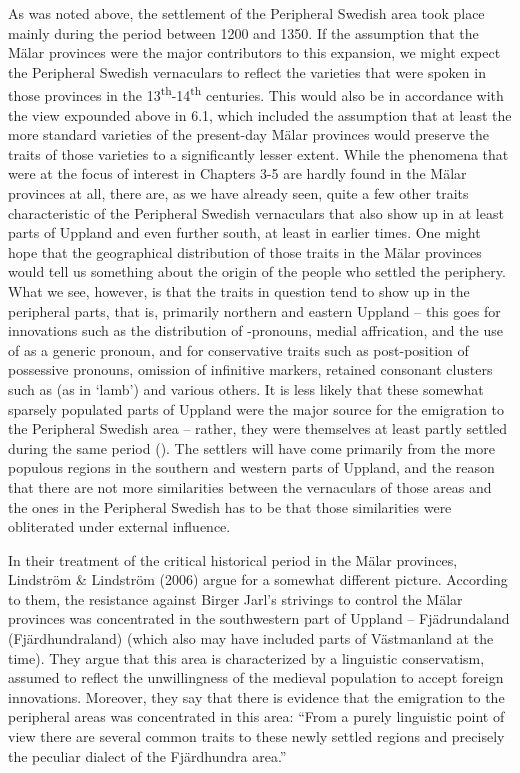 As was noted above, the settlement of the Peripheral Swedish area took place mainly during the period between 1200 and 1350. If the assumption that the Mälar provinces were the major contributors to this expansion, we might expect the Peripheral Swedish vernaculars to reflect the varieties that were spoken in those provinces in the 13\textsuperscript{th}{}-14\textsuperscript{th} centuries. This would also be in accordance with the view expounded above in 6.1, which included the assumption that at least the more standard varieties of the present-day Mälar provinces would preserve the traits of those varieties to a significantly lesser extent. While the phenomena that were at the focus of interest in Chapters 3{}-5 are hardly found in the Mälar provinces at all, there are, as we have already seen, quite a few other traits characteristic of the Peripheral Swedish vernaculars that also show up in at least parts of Uppland and even further south, at least in earlier times. One might hope that the geographical distribution of those traits in the Mälar provinces would tell us something about the origin of the people who settled the periphery. What we see, however, is that the traits in question tend to show up in the peripheral parts, that is, primarily northern and eastern Uppland – this goes for innovations such as the distribution of -pronouns, medial affrication, and the use of  as a generic pronoun, and for conservative traits such as post-position of possessive pronouns, omission of infinitive markers, retained consonant clusters such as (as in ‘lamb’)\textit{ }and various others. It is less likely that these somewhat sparsely populated parts of Uppland were the major source for the emigration to the Peripheral Swedish area – rather, they were themselves at least partly settled during the same period (\citet{Broberg1990}). The settlers will have come primarily from the more populous regions in the southern and western parts of Uppland, and the reason that there are not more similarities between the vernaculars of those areas and the ones in the Peripheral Swedish has to be that those similarities were obliterated under external influence. 




In their treatment of the critical historical period in the Mälar provinces, Lindström \& Lindström (2006) argue for a somewhat different picture. According to them, the resistance against Birger Jarl’s strivings to control the Mälar provinces was concentrated in the southwestern part of Uppland – Fjädrundaland (Fjärdhundraland) (which also may have included parts of Västmanland at the time). They argue that this area is characterized by a linguistic conservatism, assumed to reflect the unwillingness of the medieval population to accept foreign innovations. Moreover, they say that there is evidence that the emigration to the peripheral areas was concentrated in this area: “From a purely linguistic point of view there are several common traits to these newly settled regions and precisely the peculiar dialect of the Fjärdhundra area.”




